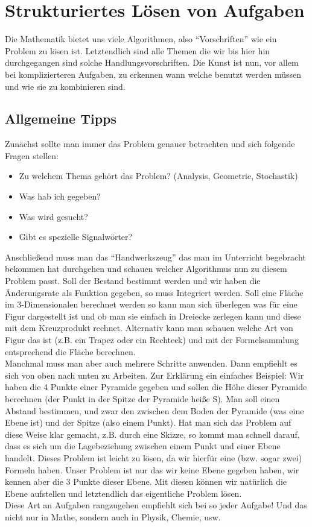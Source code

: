 \chapter{Strukturiertes Lösen von Aufgaben}
	Die Mathematik bietet uns viele Algorithmen, also "`Vorschriften"' wie ein
	Problem zu lösen ist. Letztendlich sind alle Themen die wir bis hier hin
	durchgegangen sind solche Handlungsvorschriften. Die Kunst ist nun, vor allem
	bei komplizierteren Aufgaben, zu erkennen wann welche benutzt werden müssen und
	wie sie zu kombinieren sind.
	
	\section{Allgemeine Tipps}
		Zunächst sollte man immer das Problem genauer betrachten und sich folgende
		Fragen stellen:
		\begin{itemize}
		  \item Zu welchem Thema gehört das Problem? (Analysis, Geometrie, Stochastik)
		  \item Was hab ich gegeben?
		  \item Was wird gesucht?
		  \item Gibt es spezielle Signalwörter?
		\end{itemize}
		Anschließend muss man das "`Handwerkszeug"' das man im Unterricht begebracht
		bekommen hat durchgehen und schauen welcher Algorithmus nun zu diesem Problem
		passt. Soll der Bestand bestimmt werden und wir haben die Änderungsrate als
		Funktion gegeben, so muss Integriert werden. Soll eine Fläche im
		3-Dimensionalen berechnet werden so kann man sich überlegen was für eine Figur
		dargestellt ist und ob man sie einfach in Dreiecke zerlegen kann und diese mit
		dem Kreuzprodukt rechnet. Alternativ kann man schauen welche Art von Figur das
		ist (z.B. ein Trapez oder ein Rechteck) und mit der Formelsammlung
		entsprechend die Fläche berechnen.\\
		Manchmal muss man aber auch mehrere Schritte anwenden. Dann empfiehlt es sich
		von oben nach unten zu Arbeiten. Zur Erklärung ein einfaches Beispiel: Wir
		haben die 4 Punkte einer Pyramide gegeben und sollen die Höhe dieser Pyramide
		berechnen (der Punkt in der Spitze der Pyramide heiße S). Man soll einen
		Abstand bestimmen, und zwar den zwischen dem Boden der Pyramide (was eine
		Ebene ist) und der Spitze (also einem Punkt). Hat man sich das Problem auf
		diese Weise klar gemacht, z.B. durch eine Skizze, so kommt man schnell darauf,
		dass es sich um die Lagebeziehung zwischen einem Punkt und einer Ebene
		handelt. Dieses Problem ist leicht zu lösen, da wir hierfür eine (bzw. sogar
		zwei) Formeln haben. Unser Problem ist nur das wir keine Ebene gegeben haben,
		wir kennen aber die 3 Punkte dieser Ebene. Mit diesen können wir natürlich die
		Ebene aufstellen und letztendlich das eigentliche Problem lösen.\\
		Diese Art an Aufgaben rangzugehen empfiehlt sich bei so jeder Aufgabe! Und das
		nicht nur in Mathe, sondern auch in Physik, Chemie, usw.
		
